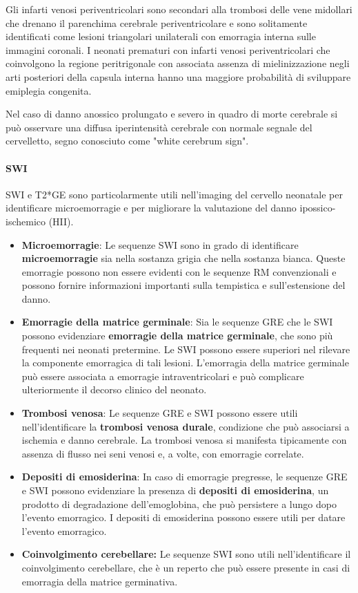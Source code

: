 
Gli infarti venosi periventricolari sono secondari alla trombosi delle vene midollari che drenano il parenchima cerebrale periventricolare e sono solitamente identificati come lesioni triangolari unilaterali con emorragia interna sulle immagini coronali. I neonati prematuri con infarti venosi periventricolari che coinvolgono la regione peritrigonale con associata assenza di mielinizzazione negli arti posteriori della capsula interna hanno una maggiore probabilità di sviluppare emiplegia congenita.

Nel caso di danno anossico prolungato e severo in quadro di morte cerebrale si può osservare una diffusa iperintensità cerebrale con normale segnale del cervelletto, segno conosciuto come "white cerebrum sign".

\paragraph{SWI} SWI e T2*GE sono particolarmente utili nell'imaging del cervello neonatale per identificare microemorragie e per migliorare la valutazione del danno ipossico-ischemico (HII).

\begin{itemize}
	\tightlist
	\item
	\textbf{Microemorragie}: Le sequenze SWI sono in grado di identificare \textbf{microemorragie} sia nella sostanza grigia che nella sostanza bianca. Queste emorragie possono non essere evidenti con le sequenze RM convenzionali e possono fornire informazioni importanti sulla tempistica e sull'estensione del danno.
	\item
	\textbf{Emorragie della matrice germinale}: Sia le sequenze GRE che le SWI possono evidenziare \textbf{emorragie della matrice germinale}, che sono più frequenti nei neonati pretermine. Le SWI possono essere superiori nel rilevare la componente emorragica di tali lesioni. L'emorragia della matrice germinale può essere associata a emorragie intraventricolari e può complicare ulteriormente il decorso clinico del neonato.
	\item
	\textbf{Trombosi venosa}: Le sequenze GRE e SWI possono essere utili nell'identificare la \textbf{trombosi venosa durale}, condizione che può associarsi a ischemia e danno cerebrale. La trombosi venosa si manifesta tipicamente con assenza di flusso nei seni venosi e, a volte, con emorragie correlate.
	\item
	\textbf{Depositi di emosiderina}: In caso di emorragie pregresse, le sequenze GRE e SWI possono evidenziare la presenza di \textbf{depositi di emosiderina}, un prodotto di degradazione dell'emoglobina, che può persistere a lungo dopo l'evento emorragico. I depositi di emosiderina possono essere utili per datare l'evento emorragico.
	\item
	\textbf{Coinvolgimento cerebellare:} Le sequenze SWI sono utili nell'identificare il coinvolgimento cerebellare, che è un reperto che può essere presente in casi di emorragia della matrice germinativa.
\end{itemize}

